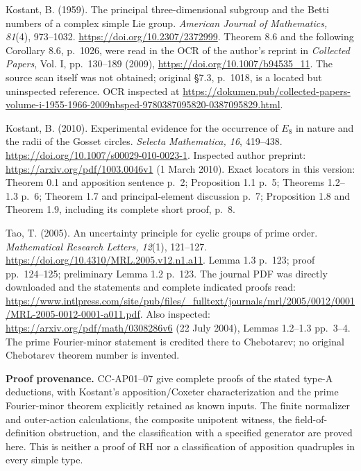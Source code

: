 \documentclass[11pt,a4paper]{article}
\theoremstyle{definition}\newtheorem{definition}[theorem]{Definition}
\theoremstyle{remark}\newtheorem{remark}[theorem]{Remark}
\begin{document}
Kostant, B. (1959). The principal three-dimensional subgroup and the
Betti numbers of a complex simple Lie group. \emph{American Journal of
Mathematics, 81}(4), 973--1032. \url{https://doi.org/10.2307/2372999}. Theorem
8.6 and the following Corollary 8.6, p.~1026, were read in the OCR of
the author's reprint in \emph{Collected Papers}, Vol. I, pp.~130--189
(2009), \url{https://doi.org/10.1007/b94535\_11}. The source scan itself was
not obtained; original §7.3, p.~1018, is a located but uninspected
reference. OCR inspected at
\url{https://dokumen.pub/collected-papers-volume-i-1955-1966-2009nbsped-9780387095820-0387095829.html}.

Kostant, B. (2010). Experimental evidence for the occurrence of \(E_8\)
in nature and the radii of the Gosset circles. \emph{Selecta
Mathematica, 16}, 419--438. \url{https://doi.org/10.1007/s00029-010-0023-1}.
Inspected author preprint: \url{https://arxiv.org/pdf/1003.0046v1} (1 March
2010). Exact locators in this version: Theorem 0.1 and apposition
sentence p.~2; Proposition 1.1 p.~5; Theorems 1.2--1.3 p.~6; Theorem 1.7
and principal-element discussion p.~7; Proposition 1.8 and Theorem 1.9,
including its complete short proof, p.~8.

Tao, T. (2005). An uncertainty principle for cyclic groups of prime
order. \emph{Mathematical Research Letters, 12}(1), 121--127.
\url{https://doi.org/10.4310/MRL.2005.v12.n1.a11}. Lemma 1.3 p.~123; proof
pp.~124--125; preliminary Lemma 1.2 p.~123. The journal PDF was directly
downloaded and the statements and complete indicated proofs read:
\url{https://www.intlpress.com/site/pub/files/\_fulltext/journals/mrl/2005/0012/0001/MRL-2005-0012-0001-a011.pdf}.
Also inspected: \url{https://arxiv.org/pdf/math/0308286v6} (22 July 2004),
Lemmas 1.2--1.3 pp.~3--4. The prime Fourier-minor statement is credited
there to Chebotarev; no original Chebotarev theorem number is invented.

\textbf{Proof provenance.} CC-AP01--07 give complete proofs of the
stated type-A deductions, with Kostant's apposition/Coxeter
characterization and the prime Fourier-minor theorem explicitly retained
as known inputs. The finite normalizer and outer-action calculations,
the composite unipotent witness, the field-of-definition obstruction,
and the classification with a specified generator are proved here. This
is neither a proof of RH nor a classification of apposition quadruples
in every simple type.

\end{document}
